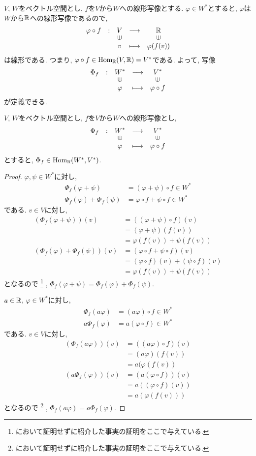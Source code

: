 $V$, $W$をベクトル空間とし,
$f$を$V$から$W$への線形写像とする.
$\varphi\in W^\ast$とすると,
$\varphi$は$W$から$\mathbb{R}$への線形写像であるので,
\begin{align*}
  \shazo{\varphi\circ f}
        {V}{\RR}
        {v}{\varphi(f(v))}
\end{align*}
は線形である.
つまり, $\varphi\circ f \in \operatorname{Hom}_{\mathbb{R}}(V,\mathbb{R})=V^\ast$である.
よって,
写像
\begin{align*}
  \shazo{\Phi_f}
        {W^\ast}{V^\ast}
        {\varphi}{\varphi\circ f}
\end{align*}
が定義できる.
\begin{lemma}
$V$, $W$をベクトル空間とし,
$f$を$V$から$W$への線形写像とし,
  \begin{align*}
    \shazo{\Phi_f}
          {W^\ast}{V^\ast}
          {\varphi}{\varphi\circ f}
\end{align*}
とすると, $\Phi_f\in \operatorname{Hom}_{\mathbb{R}}(W^\ast,V^\ast)$.
\end{lemma}
\begin{proof}
  $\varphi,\psi\in W^\ast$に対し,
  \begin{align*}
    \Phi_f(\varphi+\psi)&=(\varphi+\psi)\circ f \in W^\ast\\
    \Phi_f(\varphi)+\Phi_f(\psi)&=\varphi\circ f+\psi\circ f \in W^\ast
  \end{align*}
  である.
  $v\in V$に対し,
  \begin{align*}
    (\Phi_f(\varphi+\psi))(v)
    &=((\varphi+\psi)\circ f )(v)\\
    &=(\varphi+\psi)(f (v))\\
    &=\varphi(f (v))+\psi(f (v))\\
    (\Phi_f(\varphi)+\Phi_f(\psi))(v)
    &=(\varphi\circ f+\psi\circ f )(v)\\
    &=(\varphi\circ f)(v)+(\psi\circ f )(v)\\
    &=\varphi(f(v))+\psi( f (v))
  \end{align*}
  となるので%
  \footnote{において証明せずに紹介した事実の証明をここで与えている.}%
  ,
  $\Phi_f(\varphi+\psi)=\Phi_f(\varphi)+\Phi_f(\psi)$.

  $a\in \mathbb{R}$,
  $\varphi\in W^\ast$に対し,
  \begin{align*}
    \Phi_f(a\varphi)&=(a\varphi)\circ f \in W^\ast\\
    a\Phi_f(\varphi)&=a(\varphi\circ f)\in W^\ast
  \end{align*}
  である.
  $v\in V$に対し,
  \begin{align*}
    (\Phi_f(a\varphi))(v)
    &=((a\varphi)\circ f)(v)\\ 
    &=(a\varphi)(f(v))\\ 
    &=a(\varphi(f(v))\\ 
    (a\Phi_f(\varphi))(v)
    &=(a(\varphi\circ f))(v)\\
    &=a((\varphi\circ f)(v))\\
    &=a(\varphi(f(v)))
  \end{align*}
  となるので%
  \footnote{において証明せずに紹介した事実の証明をここで与えている.}%
  ,
  $\Phi_f(a\varphi)=a\Phi_f(\varphi)$.
\end{proof}
